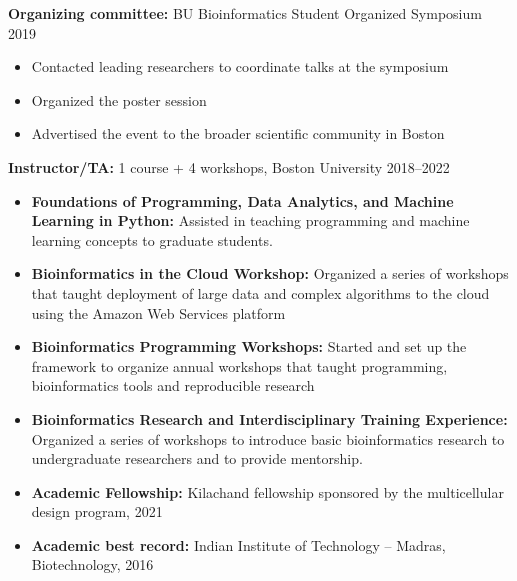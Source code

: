 \documentclass[10pt]{developercv} %
\begin{document}
\vspace{-1mm}
\begin{minipage}[t]{\textwidth}
  \textbf{Organizing committee:} BU Bioinformatics Student Organized Symposium \hfill 2019
  \vspace{-1mm}
  \begin{itemize}[itemsep=-4pt]
    \item Contacted leading researchers to coordinate talks at the symposium
    \item Organized the poster session
    \item Advertised the event to the broader scientific community in Boston
  \end{itemize}
  \textbf{Instructor/TA:} 1 course + 4 workshops, Boston University \hfill 2018--2022
  \vspace{-1mm}
  \begin{itemize}[itemsep=-4pt]
    \item \textbf{Foundations of Programming, Data Analytics, and Machine Learning in Python:} Assisted in teaching programming and machine learning concepts to graduate students.
    \item \textbf{Bioinformatics in the Cloud Workshop:} Organized a series of workshops that taught deployment of large data and complex algorithms to the cloud using the Amazon Web Services platform
    \item \textbf{Bioinformatics Programming Workshops:} Started and set up the framework to organize annual workshops that taught programming, bioinformatics tools and reproducible research
    \item \textbf{Bioinformatics Research and Interdisciplinary Training Experience:} Organized a series of workshops to introduce basic bioinformatics research to undergraduate researchers and to provide mentorship.
  \end{itemize}
\end{minipage}


\vspace{-4mm}

\begin{minipage}[t]{\textwidth}
	\vspace{-3mm}
	\begin{itemize}[itemsep=-4pt]
      \item \textbf{Academic Fellowship:} Kilachand fellowship sponsored by the multicellular design program, 2021
      \item \textbf{Academic best record:} Indian Institute of Technology -- Madras, Biotechnology, 2016
	\end{itemize}
\end{minipage}
\end{document}
